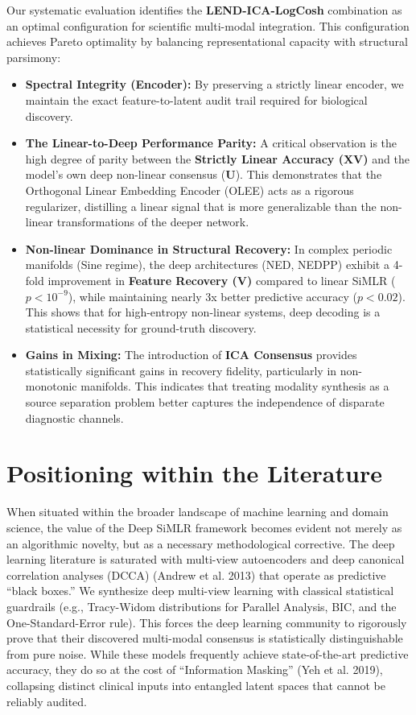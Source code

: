 \documentclass[
  letterpaper,
]{report}
\providecommand{\tightlist}{%
  \setlength{\itemsep}{0pt}\setlength{\parskip}{0pt}}
\begin{document}
Our systematic evaluation identifies the \textbf{LEND-ICA-LogCosh}
combination as an optimal configuration for scientific multi-modal
integration. This configuration achieves Pareto optimality by balancing
representational capacity with structural parsimony:

\begin{itemize}
\tightlist
\item
  \textbf{Spectral Integrity (Encoder):} By preserving a strictly linear
  encoder, we maintain the exact feature-to-latent audit trail required
  for biological discovery.
\item
  \textbf{The Linear-to-Deep Performance Parity:} A critical observation
  is the high degree of parity between the \textbf{Strictly Linear
  Accuracy (\(\mathbf{X}\mathbf{V}\))} and the model's own deep
  non-linear consensus (\(\mathbf{U}\)). This demonstrates that the
  Orthogonal Linear Embedding Encoder (OLEE) acts as a rigorous
  regularizer, distilling a linear signal that is more generalizable
  than the non-linear transformations of the deeper network.
\item
  \textbf{Non-linear Dominance in Structural Recovery:} In complex
  periodic manifolds (Sine regime), the deep architectures (NED, NEDPP)
  exhibit a 4-fold improvement in \textbf{Feature Recovery
  (\(\mathbf{V}\))} compared to linear SiMLR (\(p < 10^{-9}\)), while
  maintaining nearly 3x better predictive accuracy (\(p < 0.02\)). This
  shows that for high-entropy non-linear systems, deep decoding is a
  statistical necessity for ground-truth discovery.
\item
  \textbf{Gains in Mixing:} The introduction of \textbf{ICA Consensus}
  provides statistically significant gains in recovery fidelity,
  particularly in non-monotonic manifolds. This indicates that treating
  modality synthesis as a source separation problem better captures the
  independence of disparate diagnostic channels.
\end{itemize}

\section{Positioning within the
Literature}\label{positioning-within-the-literature}

When situated within the broader landscape of machine learning and
domain science, the value of the Deep SiMLR framework becomes evident
not merely as an algorithmic novelty, but as a necessary methodological
corrective. The deep learning literature is saturated with multi-view
autoencoders and deep canonical correlation analyses (DCCA) (Andrew et
al. 2013) that operate as predictive ``black boxes.'' We synthesize deep
multi-view learning with classical statistical guardrails (e.g.,
Tracy-Widom distributions for Parallel Analysis, BIC, and the
One-Standard-Error rule). This forces the deep learning community to
rigorously prove that their discovered multi-modal consensus is
statistically distinguishable from pure noise. While these models
frequently achieve state-of-the-art predictive accuracy, they do so at
the cost of ``Information Masking'' (Yeh et al. 2019), collapsing
distinct clinical inputs into entangled latent spaces that cannot be
reliably audited.
\end{document}
